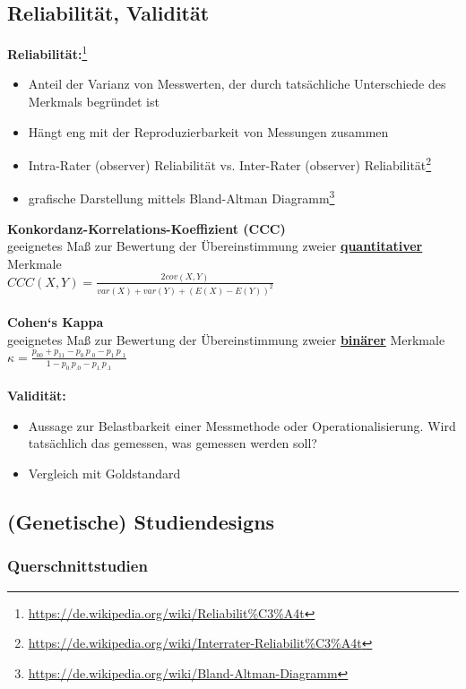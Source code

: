 \subsection{Reliabilität, Validität}
\textbf{Reliabilität:}\footnote{\url{https://de.wikipedia.org/wiki/Reliabilit\%C3\%A4t}}
\begin{itemize}
	\item Anteil der Varianz von Messwerten, der durch tatsächliche Unterschiede des Merkmals begründet ist
	\item Hängt eng mit der Reproduzierbarkeit von Messungen zusammen
	\item Intra-Rater (observer) Reliabilität vs. Inter-Rater (observer) Reliabilität\footnote{\url{https://de.wikipedia.org/wiki/Interrater-Reliabilit\%C3\%A4t}}
	\item grafische Darstellung mittels Bland-Altman Diagramm\footnote{\url{https://de.wikipedia.org/wiki/Bland-Altman-Diagramm}}
\end{itemize}

\textbf{Konkordanz-Korrelations-Koeffizient (CCC)}\\
geeignetes Maß zur Bewertung der Übereinstimmung zweier \textbf{\underline{quantitativer}} Merkmale\\
$CCC(X,Y)=\frac{2cov(X,Y)}{var(X) + var(Y)+(E(X)-E(Y))^2}$
\\\\
\textbf{Cohen‘s Kappa}\\
geeignetes Maß zur Bewertung der Übereinstimmung zweier \textbf{\underline{binärer}} Merkmale\\
$\kappa=\frac{p_{00}+p_{11}-p_{0.}p_{.0}-p_{1.}p_{.1}}{1-p_{0.}p_{.0}-p_{1.}p_{.1}}$
\\\\

\textbf{Validität:}
\begin{itemize}
	\item Aussage zur Belastbarkeit einer Messmethode oder Operationalisierung. Wird tatsächlich das gemessen, was gemessen werden soll?
	\item Vergleich mit Goldstandard
\end{itemize}

\subsection{(Genetische) Studiendesigns}
\subsubsection{Querschnittstudien}

